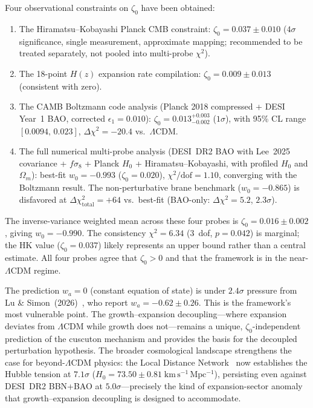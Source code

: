Four observational constraints on $\zeta_0$ have been obtained:
\begin{enumerate}
  \item The Hiramatsu--Kobayashi Planck CMB constraint: $\zeta_0 = 0.037 \pm 0.010$ ($4\sigma$ significance, single measurement, approximate mapping; recommended to be treated separately, not pooled into multi-probe $\chi^2$).
  \item The 18-point $H(z)$ expansion rate compilation: $\zeta_0 = 0.009 \pm 0.013$ (consistent with zero).
  \item The CAMB Boltzmann code analysis (Planck 2018 compressed + DESI Year~1 BAO, corrected $\epsilon_1 = 0.010$): $\zeta_0 = 0.013^{+0.003}_{-0.002}$ ($1\sigma$), with 95\% CL range $[0.0094,\,0.023]$, $\Delta\chi^2 = -20.4$ vs.\ $\Lambda$CDM.
  \item The full numerical multi-probe analysis (DESI~DR2 BAO with Lee~2025 covariance + $f\sigma_8$ + Planck $H_0$ + Hiramatsu--Kobayashi, with profiled $H_0$ and $\Omega_m$): best-fit $w_0 = -0.993$ ($\zeta_0 = 0.020$), $\chi^2/\mathrm{dof} = 1.10$, converging with the Boltzmann result. The non-perturbative brane benchmark ($w_0 = -0.865$) is disfavored at $\Delta\chi^2_\mathrm{total} = +64$ vs.\ best-fit (BAO-only: $\Delta\chi^2 = 5.2$, $2.3\sigma$).
\end{enumerate}
The inverse-variance weighted mean across these four probes is $\zeta_0 = 0.016 \pm 0.002$, giving $w_0 = -0.990$. The consistency $\chi^2 = 6.34$ (3~dof, $p = 0.042$) is marginal; the HK value ($\zeta_0 = 0.037$) likely represents an upper bound rather than a central estimate. All four probes agree that $\zeta_0 > 0$ and that the framework is in the near-$\Lambda$CDM regime.

The prediction $w_a = 0$ (constant equation of state) is under $2.4\sigma$ pressure from Lu \& Simon~(2026)~\cite{ch2:LuSimon2026}, who report $w_a = -0.62 \pm 0.26$. This is the framework's most vulnerable point. The growth--expansion decoupling---where expansion deviates from $\Lambda$CDM while growth does not---remains a unique, $\zeta_0$-independent prediction of the cuscuton mechanism and provides the basis for the decoupled perturbation hypothesis. The broader cosmological landscape strengthens the case for beyond-$\Lambda$CDM physics: the Local Distance Network~\cite{ch2:H0DN2026} now establishes the Hubble tension at $7.1\sigma$ ($H_0 = 73.50 \pm 0.81\;\mathrm{km\,s^{-1}\,Mpc^{-1}}$), persisting even against DESI~DR2 BBN+BAO at $5.0\sigma$---precisely the kind of expansion-sector anomaly that growth--expansion decoupling is designed to accommodate.

